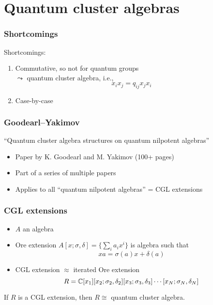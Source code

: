 \documentclass[aspectratio=169]{beamer}
\begin{document}
\section{Quantum cluster algebras}

\begin{frame}
	\frametitle{Shortcomings}

	Shortcomings:
	\begin{enumerate}
		\item Commutative, so not for quantum groups\\ \pause $\leadsto$ quantum cluster algebra,
		      i.e.,
		      \begin{equation*}
			      x_i x_j = q_{ij} x_j x_i
		      \end{equation*}%
		      \pause
		\item Case-by-case
	\end{enumerate}

\end{frame}

\begin{frame}
	\frametitle{Goodearl--Yakimov}

	\begin{center}
		``Quantum cluster algebra structures on quantum nilpotent algebras''
	\end{center}
	\begin{itemize}
		\item Paper by K. Goodearl and M. Yakimov (100+ pages)
		\item Part of a series of multiple papers
		\item Applies to all ``quantum nilpotent algebras'' = CGL extensions
	\end{itemize}

\end{frame}

\begin{frame}
	\frametitle{CGL extensions}
	\begin{itemize}
		\item $A$ an algebra
		\item Ore extension $A[x; \sigma, \delta] = \{\sum_i a_i x^i\}$ is algebra such that
		      \begin{equation*}
			      x a = \sigma(a) x + \delta(a)
		      \end{equation*}
		\item CGL extension $\approx$ iterated Ore extension
		      \begin{equation*}
			      R = \mathbb{C}[x_1][x_2; \sigma_2, \delta_2][x_3; \sigma_3, \delta_3] \dotsb [x_N; \sigma_N, \delta_N]
		      \end{equation*}
	\end{itemize}
	\begin{theorem}
		If $R$ is a CGL extension, then $R \cong$ quantum cluster algebra.
	\end{theorem}

\end{frame}
\end{document}
